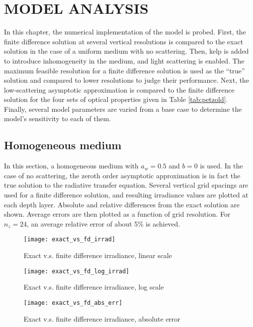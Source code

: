 \chapter{MODEL ANALYSIS}
\label{chap:model_analysis}

In this chapter, the numerical implementation of the model is probed.
First, the finite difference solution at several vertical resolutions
is compared to the exact solution in the case of a uniform medium with no scattering.
Then, kelp is added to introduce inhomogeneity in the medium, and light scattering is enabled.
The maximum feasible resolution for a finite difference solution is used as the ``true'' solution
and compared to lower resolutions to judge their performance.
Next, the low-scattering asymptotic approximation is compared to the finite difference solution
for the four sets of optical properties given in Table \ref{tab:petzold}.
Finally, several model parameters are varied from a base case to determine the model's sensitivity to each of them. 

\section{Homogeneous medium}
In this section, a homogeneous medium with $a_w=0.5$ and $b=0$ is used.
In the case of no scattering, the zeroth order asymptotic approximation
is in fact the true solution to the radiative transfer equation.
Several vertical grid spacings are used for a finite difference solution,
and resulting irradiance values are plotted at each depth layer.
Absolute and relative differences from the exact solution are shown.
Average errors are then plotted as a function of grid resolution.
For $n_z=24$, an average relative error of about 5\% is achieved.

\begin{figure}[H]
  \centering
  \texttt{[image: exact\_vs\_fd\_irrad]}
  \caption{Exact v.s. finite difference irradiance, linear scale}
\end{figure}

\begin{figure}[H]
  \centering
  \texttt{[image: exact\_vs\_fd\_log\_irrad]}
  \caption{Exact v.s. finite difference irradiance, log scale}
\end{figure}

\begin{figure}[H]
  \centering
  \texttt{[image: exact\_vs\_fd\_abs\_err]}
  \caption{Exact v.s. finite difference irradiance, absolute error}
\end{figure}

